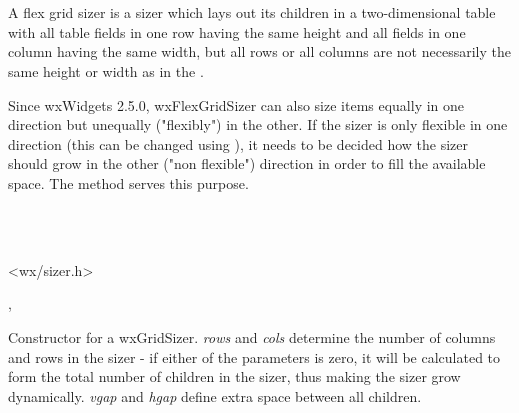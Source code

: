 \section{}\label{wxflexgridsizer}

A flex grid sizer is a sizer which lays out its children in a two-dimensional
table with all table fields in one row having the same
height and all fields in one column having the same width, but all
rows or all columns are not necessarily the same height or width as in
the .

Since wxWidgets 2.5.0, wxFlexGridSizer can also size items equally in one
direction but unequally ("flexibly") in the other. If the sizer is only
flexible in one direction (this can be changed using 
),
it needs to be decided how the sizer should grow in the other ("non flexible")
direction in order to fill the available space. The 
 method
serves this purpose.


\\
\\


<wx/sizer.h>


, 


\label{wxflexgridsizerwxflexgridsizer}



Constructor for a wxGridSizer. {\it rows} and {\it cols} determine the number of
columns and rows in the sizer - if either of the parameters is zero, it will be
calculated to form the total number of children in the sizer, thus making the
sizer grow dynamically. {\it vgap} and {\it hgap} define extra space between
all children.


\label{wxflexgridsizeraddgrowablecol}

